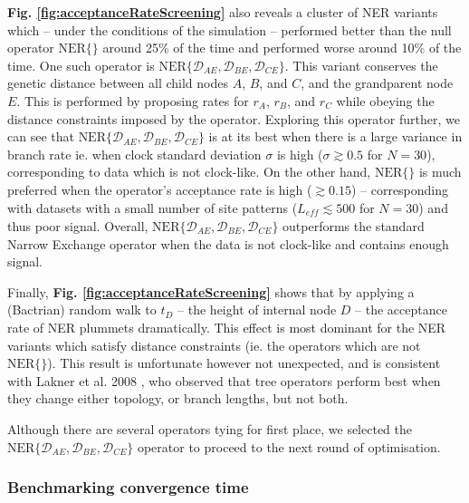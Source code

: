 \documentclass[10pt,letterpaper]{article}
\begin{document}
\textbf{Fig. \ref{fig:acceptanceRateScreening}} also reveals a cluster of NER variants which -- under the conditions of the simulation --  performed better than the null operator $\text{NER}\{\}$ around 25\% of the time and performed worse around 10\% of the time. One such operator is  $\text{NER}\{\mathcal{D}_{AE}, \mathcal{D}_{BE}, \mathcal{D}_{CE}\}$. This variant conserves the genetic distance between all child nodes $A$, $B$, and $C$, and the grandparent node $E$. This is performed by proposing rates for $r_A$, $r_B$, and $r_C$ while obeying the distance constraints imposed by the operator. Exploring this operator further, we can see that $\text{NER}\{\mathcal{D}_{AE}, \mathcal{D}_{BE}, \mathcal{D}_{CE}\}$ is at its best when there is a large variance in branch rate ie. when clock standard deviation $\sigma$ is high ($\sigma \gtrsim 0.5$ for $N=30$), corresponding to data which is not clock-like. On the other hand, $\text{NER}\{\}$ is much preferred when the operator's acceptance rate is high ($\gtrsim 0.15$) -- corresponding with datasets with a small number of site patterns ($L_\textit{eff} \lesssim 500$ for $N=30$) and thus poor signal.  Overall, $\text{NER}\{\mathcal{D}_{AE}, \mathcal{D}_{BE}, \mathcal{D}_{CE}\}$ outperforms the standard Narrow Exchange operator when the data is not clock-like and contains enough signal. 




Finally, \textbf{Fig. \ref{fig:acceptanceRateScreening}} shows that by applying a (Bactrian) random walk to $t_D$ -- the height of internal node $D$ -- the acceptance rate of NER plummets dramatically. This effect is most dominant for the NER variants which satisfy distance constraints (ie. the operators which are not $\text{NER}\{\}$). This result is unfortunate however not unexpected, and is consistent with Lakner et al. 2008 \cite{lakner2008efficiency}, who observed that tree operators perform best when they change either topology, or branch lengths, but not both.



Although there are several operators tying for first place, we selected the $\text{NER}\{\mathcal{D}_{AE}, \mathcal{D}_{BE}, \mathcal{D}_{CE}\}$ operator to proceed to the next round of optimisation.





\subsubsection*{Benchmarking convergence time}
\end{document}
